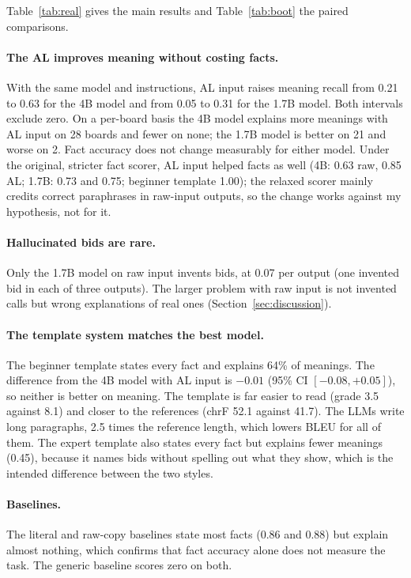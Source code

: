 \documentclass[11pt]{article}
\begin{document}
Table~\ref{tab:real} gives the main results and Table~\ref{tab:boot} the paired comparisons.

\paragraph{The AL improves meaning without costing facts.} With the same model and instructions, AL input raises meaning recall from 0.21 to 0.63 for the 4B model and from 0.05 to 0.31 for the 1.7B model. Both intervals exclude zero. On a per-board basis the 4B model explains more meanings with AL input on 28 boards and fewer on none; the 1.7B model is better on 21 and worse on 2. Fact accuracy does not change measurably for either model. Under the original, stricter fact scorer, AL input helped facts as well (4B: 0.63 raw, 0.85 AL; 1.7B: 0.73 and 0.75; beginner template 1.00); the relaxed scorer mainly credits correct paraphrases in raw-input outputs, so the change works against my hypothesis, not for it.

\paragraph{Hallucinated bids are rare.} Only the 1.7B model on raw input invents bids, at 0.07 per output (one invented bid in each of three outputs). The larger problem with raw input is not invented calls but wrong explanations of real ones (Section~\ref{sec:discussion}).

\paragraph{The template system matches the best model.} The beginner template states every fact and explains 64\% of meanings. The difference from the 4B model with AL input is $-0.01$ (95\% CI $[-0.08, +0.05]$), so neither is better on meaning. The template is far easier to read (grade 3.5 against 8.1) and closer to the references (chrF 52.1 against 41.7). The LLMs write long paragraphs, 2.5 times the reference length, which lowers BLEU for all of them. The expert template also states every fact but explains fewer meanings (0.45), because it names bids without spelling out what they show, which is the intended difference between the two styles.

\paragraph{Baselines.} The literal and raw-copy baselines state most facts (0.86 and 0.88) but explain almost nothing, which confirms that fact accuracy alone does not measure the task. The generic baseline scores zero on both.
\end{document}
